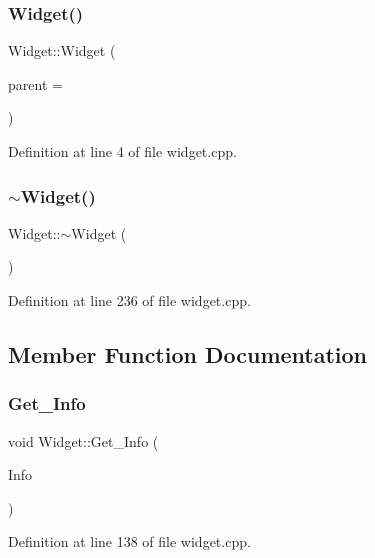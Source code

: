 \subsubsection{\texorpdfstring{Widget()}{Widget()}}
{\footnotesize\ttfamily Widget\+::\+Widget (\begin{DoxyParamCaption}\item[{Q\+Widget $\ast$}]{parent = {} }\end{DoxyParamCaption})}



Definition at line 4 of file widget.\+cpp.

\mbox{\label{class_widget_aa24f66bcbaaec6d458b0980e8c8eae65}} 
\subsubsection{\texorpdfstring{$\sim$Widget()}{~Widget()}}
{\footnotesize\ttfamily Widget\+::$\sim$\+Widget (\begin{DoxyParamCaption}{ }\end{DoxyParamCaption})}



Definition at line 236 of file widget.\+cpp.



\subsection{Member Function Documentation}
\mbox{\label{class_widget_a0b1204d50863ef19c6ed3e39ab455d25}} 
\subsubsection{\texorpdfstring{Get\_Info}{Get\_Info}}
{\footnotesize\ttfamily void Widget\+::\+Get\+\_\+\+Info (\begin{DoxyParamCaption}\item[{Q\+Byte\+Array}]{Info }\end{DoxyParamCaption})\hspace{0.3cm}{\ttfamily [slot]}}



Definition at line 138 of file widget.\+cpp.

